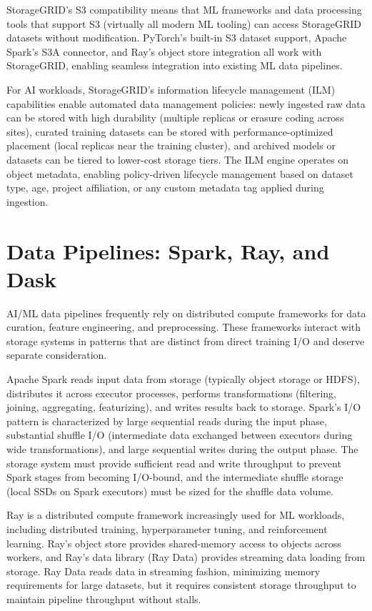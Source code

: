 StorageGRID's S3 compatibility means that ML frameworks and data processing
tools that support S3 (virtually all modern ML tooling) can access StorageGRID
datasets without modification. PyTorch's built-in S3 dataset support, Apache
Spark's S3A connector, and Ray's object store integration all work with
StorageGRID, enabling seamless integration into existing ML data pipelines.

For AI workloads, StorageGRID's information lifecycle management (ILM)
capabilities enable automated data management policies: newly ingested raw
data can be stored with high durability (multiple replicas or erasure coding
across sites), curated training datasets can be stored with
performance-optimized placement (local replicas near the training cluster),
and archived models or datasets can be tiered to lower-cost storage tiers. The
ILM engine operates on object metadata, enabling policy-driven lifecycle
management based on dataset type, age, project affiliation, or any custom
metadata tag applied during ingestion.

\section{Data Pipelines: Spark, Ray, and Dask}

AI/ML data pipelines frequently rely on distributed compute frameworks for
data curation, feature engineering, and preprocessing. These frameworks
interact with storage systems in patterns that are distinct from direct
training I/O and deserve separate consideration.

Apache Spark reads input data from storage (typically object storage or HDFS),
distributes it across executor processes, performs transformations (filtering,
joining, aggregating, featurizing), and writes results back to storage.
Spark's I/O pattern is characterized by large sequential reads during the
input phase, substantial shuffle I/O (intermediate data exchanged between
executors during wide transformations), and large sequential writes during the
output phase. The storage system must provide sufficient read and write
throughput to prevent Spark stages from becoming I/O-bound, and the
intermediate shuffle storage (local SSDs on Spark executors) must be sized for
the shuffle data volume.

Ray is a distributed compute framework increasingly used for ML workloads,
including distributed training, hyperparameter tuning, and reinforcement
learning. Ray's object store provides shared-memory access to objects across
workers, and Ray's data library (Ray Data) provides streaming data loading
from storage. Ray Data reads data in streaming fashion, minimizing memory
requirements for large datasets, but it requires consistent storage throughput
to maintain pipeline throughput without stalls.

